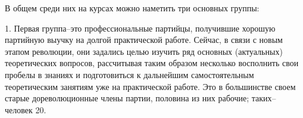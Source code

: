 \begin{table}[h]
\centering
{}
\end{table}

В общем среди них на курсах можно наметить три основных группы:

1. Первая группа\---это профессиональные партийцы, получившие хорошую партийную выучку на долгой практической работе. Сейчас, в связи с новым этапом революции, они задались целью изучить ряд основных (актуальных) теоретических вопросов, рассчитывая таким образом несколько восполнить свои пробелы в знаниях и подготовиться к дальнейшим самостоятельным теоретическим занятиям уже на практической работе. Это в большинстве своем старые дореволюционные члены партии, половина из них рабочие; таких\--- человек 20.

